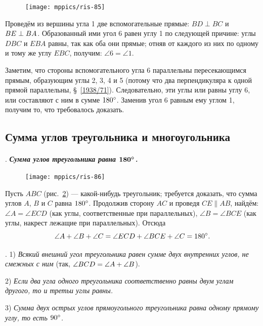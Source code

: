 \documentclass[twoside]{book}
\begin{document}
\begin{figure}
\centering
\texttt{[image: mppics/ris-85]}
\caption{}\label{1938/ris-85}
\end{figure}

Проведём из вершины угла 1 две вспомогательные прямые:
$BD\perp BC$ и $BE\z\perp BA$.
Образованный ими угол 6 равен углу 1 по следующей причине:
углы $DBC$ и $EBA$ равны, так как оба они прямые;
отняв от каждого из них по одному и тому же углу $EBC$, получим: $\angle 6 = \angle 1$.

Заметим, что стороны вспомогательного угла 6 параллельны пересекающимся прямым, образующим углы 2, 3, 4 и 5 (потому что два перпендикуляра к одной прямой параллельны, §~\ref{1938/71}). 
Следовательно, эти углы или равны углу 6, или составляют с ним в сумме $180\degree$.
Заменив угол 6 равным ему углом 1, получим то, что требовалось доказать.

\subsection*{Сумма углов треугольника и многоугольника}

\paragraph{}\label{1938/81}
\mbox{.}
\textbf{\emph{Сумма углов треугольника равна $\bm{180\degree}$.}}

\begin{figure}
\centering
\texttt{[image: mppics/ris-86]}
\caption{}\label{1938/ris-86}
\end{figure}


Пусть $ABC$ (рис.~\ref{1938/ris-86}) — какой-нибудь треугольник;
требуется доказать, что сумма углов $A$, $B$ и $C$ равна $180\degree$.
Продолжив сторону $AC$ и проведя $CE\parallel AB$, найдём:
$\angle A = \angle ECD$ (как углы, соответственные при параллельных), $\angle B = \angle BCE$ (как углы, накрест лежащие при параллельных). 
Отсюда
\[\angle A + \angle B+\angle C = \angle ECD + \angle BCE + \angle C =180\degree.\]

\smallskip
{}.
1) \emph{Всякий внешний угол треугольника равен сумме двух внутренних углов, не смежных с ним} (так, $\angle BCD \z= \angle A + \angle B$).

2) \emph{Если два угла одного треугольника соответственно равны двум углам другого, то и третьи углы равны.}

3) \emph{Сумма двух острых углов прямоугольного треугольника равна одному прямому углу, то есть $90\degree$.}
\end{document}
